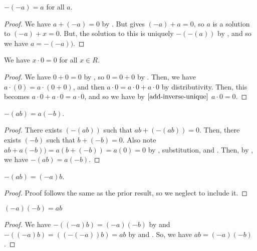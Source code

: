 \begin{theorem}\label{inverse-of-inverse-is-original}
    $-(-a) = a$ for all $a$. 
\end{theorem}
\begin{proof}
    We have $a + (-a) = 0$ by . But  gives $(-a) + a = 0$, so $a$ is a solution to $(-a) + x = 0$. But, the solution to this is uniquely $-(-(a))$ by , and so we have $a = -(-a))$. 
\end{proof}

\begin{theorem}[Multiplication by $0$ is $0$]\label{mult-by-0-is-0}
    We have $x \cdot 0 = 0$ for all $x \in R$.
\end{theorem}
\begin{proof}
We have $0 + 0 = 0$ by , so $0=0+0$ by . Then, we have $a \cdot (0) = a \cdot (0+0)$, and then $a \cdot 0 = a\cdot 0 + a\cdot 0$ by distributivity. Then, this becomes $a \cdot 0 + a \cdot 0 = a\cdot 0$, and so we have by $\Cref{add-inverse-unique}$ $a \cdot 0= 0$. 
\end{proof}

\begin{theorem}\label{right-dist-inverses}
$-(ab) = a(-b)$.
\end{theorem}
\begin{proof}
There exists $(-(ab))$ such that $ab + (-(ab)) = 0$. Then, there exists $(-b)$ such that $b + (-b) = 0$. Also note $ab + a(-b)) = a(b+(-b)) = a(0) = 0$ by , substitution, and . Then, by , we have $-(ab) = a(-b)$.
\end{proof}

\begin{theorem}\label{left-dist-inverses}
$-(ab) = (-a)b$.
\end{theorem}
\begin{proof} Proof follows the same as the prior result, so we neglect to include it. 
\end{proof}

\begin{theorem}\label{inverses-mult-original}
$(-a)(-b) = ab$
\end{theorem}
\begin{proof}
We have $-((-a)b) = (-a)(-b)$ by  and $-((-a)b) = ((-(-a))b) = ab$ by  and . So, we have $ab = (-a)(-b)$. 
\end{proof}

